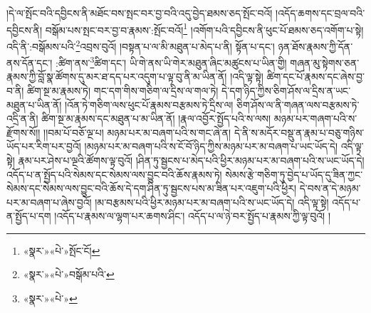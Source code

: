 །དེ་ལ་སྤོང་བའི་དབྱིངས་ནི་མཐོང་བས་སྤང་བར་བྱ་བའི་འདུ་བྱེད་ཐམས་ཅད་སྤོང་བའོ། །འདོད་ཆགས་དང་བྲལ་བའི་དབྱིངས་ནི། བསྒོམ་པས་སྤང་བར་བྱ་བ་རྣམས་:སྤོང་བའོ།\footnote{«སྣར་»«པེ་»སྤོང་ངོ།} །འགོག་པའི་དབྱིངས་ནི་ཕུང་པོ་ཐམས་ཅད་འགོག་པ་སྟེ། འདི་ནི་:བསྒོམས་པའི་\footnote{«སྣར་»«པེ་»བསྒོམ་པའི་}འབྲས་བུའོ། །བསྟན་པ་ལ་མི་མཐུན་པ་མེད་པ་ནི། སྟོན་པ་དང་། ཉན་ཐོས་རྣམས་ཀྱི་དོན་ནས་དོན་དང་། :ཚིག་ནས་\footnote{«སྣར་»«པེ་»}ཚིག་དང་། ཡི་གེ་ནས་ཡི་གེར་མཐུན་ཞིང་མཚུངས་པ་ཡིན་གྱི། གཞན་མུ་སྟེགས་ཅན་རྣམས་ཀྱི་བློ་སྣ་ཚོགས་དུ་མར་ཐ་དད་པར་འདུག་པ་ལྟ་བུ་ནི་མ་ཡིན་ནོ། །འདི་ལྟ་སྟེ། ཚིག་དང་པོ་རྣམས་དང་ཞེས་བྱ་བ་ནི། ཚིག་སྔ་མ་རྣམས་ཏེ། གང་དག་གིས་གཅིག་ལ་དྲིས་ལ་གལ་ཏེ། དེ་དག་ཉིད་ཀྱིས་ཅིག་ཤོས་ལ་དྲིས་ན་ཡང་མཐུན་པ་ཡིན་ནོ། །འོན་ཏེ་གཅིག་ལས་ཕུང་པོ་རྣམས་བརྩམས་ཏེ་དྲིས་ལ། ཅིག་ཤོས་ལ་ནི་གཞན་ལས་བརྩམས་ཏེ་འདྲི་ན་ནི། ཚིག་སྔ་མ་རྣམས་དང་མཐུན་པ་མ་ཡིན་ནོ། །རྣལ་འབྱོར་སྤྱོད་པའི་ས་ལས། མཉམ་པར་གཞག་པའི་ས་རྫོགས་སོ།། །།བམ་པོ་བཅོ་ལྔ་པ། མཉམ་པར་མ་བཞག་པའི་ས་གང་ཞེ་ན། དེ་ནི་ས་མདོར་བསྡུ་ན་རྣམ་པ་བཅུ་གཉིས་ཡོད་པར་རིག་པར་བྱའོ། །མཉམ་པར་མ་བཞག་པའི་ས་ངོ་བོ་ཉིད་ཀྱིས་མཉམ་པར་མ་བཞག་པ་ཡང་ཡོད་དེ། འདི་ལྟ་སྟེ། རྣམ་པར་ཤེས་པ་ལྔའི་ཚོགས་ལྟ་བུའོ། །ཤིན་ཏུ་སྦྱངས་པ་མེད་པའི་ཕྱིར་མཉམ་པར་མ་བཞག་པའི་ས་ཡང་ཡོད་དེ། འདོད་པ་ན་སྤྱོད་པའི་སེམས་དང་སེམས་ལས་བྱུང་བའི་ཆོས་རྣམས་ཏེ། སེམས་རྩེ་གཅིག་ཏུ་བྱེད་པ་ཡོད་དུ་ཟིན་ཀྱང་སེམས་དང་སེམས་ལས་བྱུང་བའི་ཆོས་དེ་དག་ཤིན་ཏུ་སྦྱངས་པས་མ་ཟིན་པར་འཇུག་པའི་ཕྱིར། དེ་བས་ན་དེ་མཉམ་པར་མ་བཞག་པ་ཞེས་བྱའོ། །མ་བརྩམས་པའི་ཕྱིར་མཉམ་པར་མ་བཞག་པའི་ས་ཡང་ཡོད་དེ། འདི་ལྟ་སྟེ། འདོད་པ་ན་སྤྱོད་པ་དག །འདོད་པ་རྣམས་ལ་ལྷག་པར་ཆགས་ཤིང་། འདོད་པ་ལ་ཉེ་བར་སྤྱོད་པ་རྣམས་ཀྱི་ལྟ་བུའོ། །
